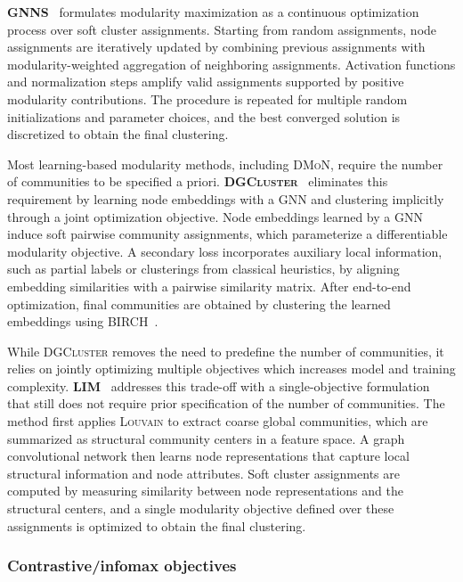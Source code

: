 \documentclass[../paper.tex]{subfiles}
\begin{document}
\textbf{\textsc{GNNS}}~\cite{gnns2022} formulates modularity maximization as a continuous optimization process over soft cluster assignments.
Starting from random assignments, node assignments are iteratively updated by combining previous assignments with modularity-weighted aggregation of neighboring assignments.
Activation functions and normalization steps amplify valid assignments supported by positive modularity contributions.
The procedure is repeated for multiple random initializations and parameter choices, and the best converged solution is discretized to obtain the final clustering.

Most learning-based modularity methods, including \textsc{DMoN}, require the number of communities to be specified a priori. \textbf{\textsc{DGCluster}}~\cite{dgcluster2024} eliminates this requirement by learning node embeddings with a GNN and clustering implicitly through a joint optimization objective.
Node embeddings learned by a GNN induce soft pairwise community assignments, which parameterize a differentiable modularity objective.
A secondary loss incorporates auxiliary local information, such as partial labels or clusterings from classical heuristics, by aligning embedding similarities with a pairwise similarity matrix.
After end-to-end optimization, final communities are obtained by clustering the learned embeddings using \textsc{BIRCH}~\cite{birch1996}.

While \textsc{DGCluster} removes the need to predefine the number of communities, it relies on jointly optimizing multiple objectives which increases model and training complexity.
\textbf{\textsc{LIM}}~\cite{lim2025} addresses this trade-off with a single-objective formulation that still does not require prior specification of the number of communities.
The method first applies \textsc{Louvain} to extract coarse global communities, which are summarized as structural community centers in a feature space.
A graph convolutional network then learns node representations that capture local structural information and node attributes.
Soft cluster assignments are computed by measuring similarity between node representations and the structural centers, and a single modularity objective defined over these assignments is optimized to obtain the final clustering.

\subsubsection{Contrastive/infomax objectives}
\end{document}

